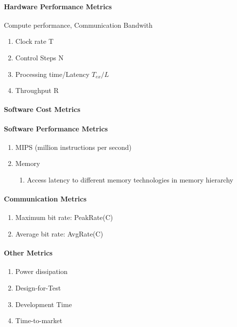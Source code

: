 \documentclass[english]{latex4ei/latex4ei_sheet}
\begin{document}
\paragraph{Hardware Performance Metrics}
Compute performance, Communication Bandwith
\begin{enumerate}
  \item Clock rate T
  \item Control Steps N
  \item Processing time/Latency $T_{ex} / L$
  \item Throughput R
\end{enumerate}
 
\paragraph{Software Cost Metrics}

\paragraph{Software Performance Metrics}
\begin{enumerate}
	\item MIPS (million instructions per second)
	\item Memory
	  \begin{enumerate}
	  	\item Access latency to different memory technologies in memory hierarchy
	  \end{enumerate}
\end{enumerate}

\paragraph{Communication Metrics}
\begin{enumerate}
	\item Maximum bit rate: PeakRate(C)
	\item Average bit rate: AvgRate(C)
\end{enumerate}

\paragraph{Other Metrics}
\begin{enumerate}
	\item Power dissipation
	\item Design-for-Test
	\item Development Time
	\item Time-to-market
\end{enumerate}
\end{document}
